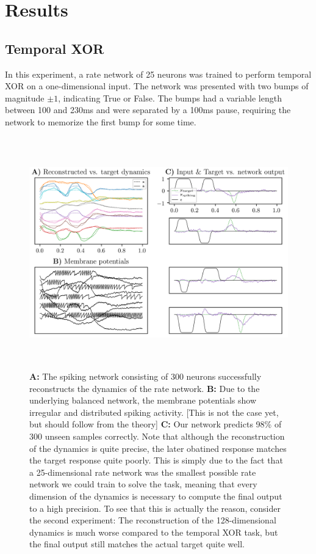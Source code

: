 \documentclass[twoside,11pt,titlepage]{article}
\begin{document}
\section{Results}

\subsection{Temporal XOR}
In this experiment, a rate network of 25 neurons was trained to perform
temporal XOR on a one-dimensional input. The network was presented with two bumps
of magnitude $\pm 1$, indicating True or False. The bumps had a variable length
between 100 and 230ms and were separated by a 100ms pause, requiring the network
to memorize the first bump for some time. 

\begin{figure}[!htb]
  \includegraphics[width = \columnwidth, height=10cm]{figures/figure2.png}
  \caption{\textbf{A:} The spiking network consisting
  of 300 neurons successfully reconstructs the dynamics of the rate network.
  \textbf{B:} Due to the underlying balanced network, the membrane potentials show
  irregular and distributed spiking activity. [This is not the case yet, but should follow from the theory]
  \textbf{C:} Our network predicts 98\% of 300 unseen samples correctly. Note that although the
  reconstruction of the dynamics is quite precise, the later obatined response matches
  the target response quite poorly. This is simply due to the fact that a 25-dimensional
  rate network was the smallest possible rate network we could train to solve the task, meaning
  that every dimension of the dynamics is necessary to compute the final output to a high
  precision. To see that this is actually the reason, consider the second experiment:
  The reconstruction of the 128-dimensional dynamics is much worse compared to the temporal
  XOR task, but the final output still matches the actual target quite well.}
  \label{fig:figure2}
\end{figure}
\end{document}
